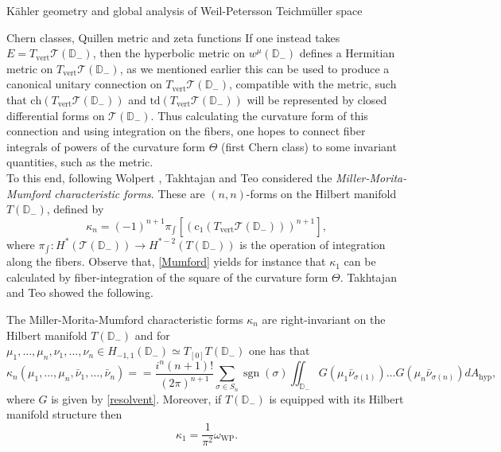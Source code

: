 \documentclass[12pt]{amsart}
\newcommand{\disk}{\ensuremath{\mathbb{D}} } %
\theoremstyle{plain}
\theoremstyle{definition}
\theoremstyle{remark}
\numberwithin{equation}{section} %
\numberwithin{figure}{section} %
\begin{document}
\begin{section}{K\"ahler geometry and global analysis of Weil-Petersson Teichm\"uller space}
\begin{subsection}{Chern classes, Quillen metric and zeta functions}
If one instead takes $E=T_{\mathrm{vert}}\mathscr{T}(\disk_-)$, then the hyperbolic metric on $w^{\mu} (\mathbb{D}_{-})$ defines a Hermitian metric on $T_{\mathrm{vert}}\mathscr{T}(\disk_-)$, as we mentioned earlier this can be used to produce a canonical unitary connection on $T_{\mathrm{vert}}\mathscr{T}(\disk_-)$, compatible with the metric, such that $\mathrm{ch}(T_{\mathrm{vert}}\mathscr{T}(\disk_-))$ and $\mathrm{td}(T_{\mathrm{vert}}\mathscr{T}(\disk_-))$ will be represented by closed differential forms on $\mathscr{T}(\disk_-)$. Thus calculating the curvature form of this connection and using integration on the fibers, one hopes to connect fiber integrals of powers of the curvature form $\Theta$ (first Chern class) to some invariant quantities, such as the metric.\\

To this end, following Wolpert \cite{Wolpert}, Takhtajan and Teo \cite{Takhtajan_Teo_Memoirs}  considered the \emph{Miller-Morita-Mumford characteristic forms}. These are $(n,n)$-forms on
the Hilbert manifold $T(\disk_-)$, defined by
\begin{equation}\label{Mumford}
  \kappa_n = (-1)^{n+1} \pi_{\int} [(\mathrm{c}_{1}(T_{\mathrm{vert}}\mathscr{T}(\disk_-)))^{n+1}],
\end{equation}
where $\pi_{\int} : H^{*}(\mathscr{T}(\disk_-))\to H^{*-2}(T(\disk_-))$ is the operation of integration along the fibers. Observe that, \eqref{Mumford} yields for instance that $\kappa_1$ can be calculated by fiber-integration of the square of the curvature form $\Theta$.
Takhtajan and Teo showed the following.

The Miller-Morita-Mumford characteristic forms \(\kappa_{n}\) are right-invariant on the Hilbert manifold \(T(\mathbb{D}_-)\)
and for \(\mu_{1}, \ldots, \mu_{n}, \nu_{1}, \ldots, \nu_{n} \in H_{-1,1}\left(\mathbb{D}_{-}\right) \simeq T_{[0]} T(\mathbb{D}_-)\)
one has that
\begin{equation*}
   \kappa_{n}\left(\mu_{1}, \ldots, \mu_{n}, \bar{\nu}_{1}, \ldots, \bar{\nu}_{n}\right) ==\frac{i^{n}(n+1) !}{(2 \pi)^{n+1}} \sum_{\sigma \in S_{n}} \operatorname{sgn}(\sigma) \iint_{\mathbb{D}_{-}} G\left(\mu_{1} \bar{\nu}_{\sigma(1)}\right) \ldots G\left(\mu_{n} \bar{\nu}_{\sigma(n)}\right) dA_{\mathrm{hyp}},
\end{equation*}
where $G$ is given by \eqref{resolvent}.
Moreover, if $T(\disk_-)$ is equipped with its Hilbert manifold structure then
\begin{equation}\label{TT index 1}
 \kappa_1=\frac{1}{\pi^2} \omega_{\mathrm{WP}}.
\end{equation}


\end{subsection}
\end{section}
\end{document}
